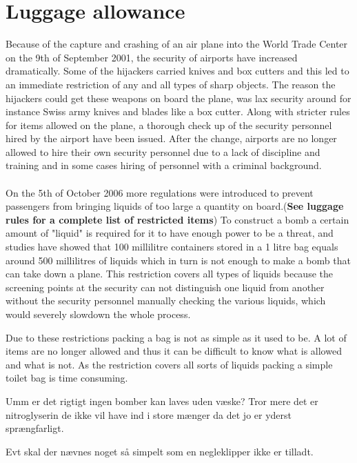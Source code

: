 \section{Luggage allowance}

Because of the capture and crashing of an air plane into the World Trade Center on the 9th of September 2001, the security of airports have increased dramatically. Some of the hijackers carried knives and box cutters and this led to an immediate restriction of any and all types of sharp objects. The reason the hijackers could get these weapons on board the plane, was lax security around for instance Swiss army knives and blades like a box cutter. Along with stricter rules for items allowed on the plane, a thorough check up of the security personnel hired by the airport have been issued. After the change, airports are no longer allowed to hire their own security personnel due to a lack of discipline and training and in some cases hiring of personnel with a criminal background.\citep{Stricter_rules}\\
\\
On the 5th of October 2006 more regulations were introduced to prevent passengers from bringing liquids of too large a quantity on board.(\textbf{See luggage rules for a complete list of restricted items}) To construct a bomb a certain amount of "liquid" is required for it to have enough power to be a threat, and studies have showed that 100 millilitre containers stored in a 1 litre bag equals around 500 millilitres of liquids which in turn is not enough to make a bomb that can take down a plane. This restriction covers all types of liquids because the screening points at the security can not distinguish one liquid from another without the security personnel manually checking the various liquids, which would severely slowdown the whole process.\citep{Why_rules}\newline

Due to these restrictions packing a bag is not as simple as it used to be. A lot of items are no longer allowed and thus it can be difficult to know what is allowed and what is not. As the restriction covers all sorts of liquids packing a simple toilet bag is time consuming.

Umm er det rigtigt ingen bomber kan laves uden væske? Tror mere det er nitroglyserin de ikke vil have ind i store mænger da det jo er yderst sprængfarligt.

Evt skal der nævnes noget så simpelt som en negleklipper ikke er tilladt.
